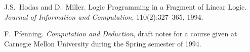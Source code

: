 
\begin{thebibliography}{99}

  J.S.\ Hodas and D.\ Miller. Logic Programming in a Fragment of Linear
  Logic. {\em Journal of Information and Computation}, 110(2):327--365, 1994.
  
  F.\ Pfenning. {\em Computation and Deduction}, draft notes
  for a course given at Carnegie Mellon University during the Spring
  semester of 1994.
  
\end{thebibliography}



